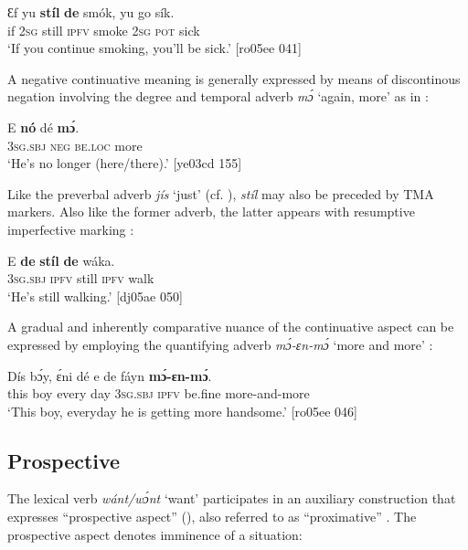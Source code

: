 \ea%
    \label{ex:key:368}
    \gll Ɛf  yu  \textbf{stíl} \textbf{de} smók,  yu  go  sík.\\
if  \textsc{2sg}  still  \textsc{ipfv}  smoke  \textsc{2sg}  \textsc{pot}  sick\\

\glt ‘If you continue smoking, you’ll be sick.’ [ro05ee 041]
\z

A negative continuative meaning is generally expressed by means of discontinous negation involving the degree and temporal adverb \textit{mɔ́} ‘again, more’ as in :


\ea%
    \label{ex:key:369}
    \gll E    \textbf{nó}  dé\textbf{}   \textbf{mɔ́}.\\
\textsc{3sg.sbj}  \textsc{neg}  \textsc{be.loc}  more\\

\glt ‘He’s no longer (here/there).’ [ye03cd 155]
\z

Like the preverbal adverb \textit{jís} ‘just’ (cf. ), \textit{stíl} may also be preceded by TMA markers. Also like the former adverb, the latter appears with resumptive imperfective marking : 


\ea%
    \label{ex:key:370}
    \gll E    \textbf{de} \textbf{stíl} \textbf{de}  wáka.\\
\textsc{3sg.sbj}  \textsc{ipfv}  still  \textsc{ipfv}  walk\\

\glt ‘He’s still walking.’ [dj05ae 050]
\z

A gradual and inherently comparative nuance of the continuative aspect can be expressed by employing the quantifying adverb \textit{mɔ́-ɛn-mɔ́} ‘more and more’ : 


\ea%
    \label{ex:key:371}
    \gll Dís  bɔ́y,    ɛ́ni    dé  e    de  fáyn    \textbf{mɔ́-ɛn-mɔ́}.\\
this  boy    every  day  \textsc{3sg.sbj}  \textsc{ipfv}  be.fine  more-and-more\\

\glt ‘This boy, everyday he is getting more handsome.’ [ro05ee 046]
\z

\subsection{Prospective} 

The lexical verb \textit{wánt/wɔ́nt} ‘want’ participates in an auxiliary construction that expresses “prospective aspect” (\citealt[64–65]{Comrie1976}), also referred to as “proximative” \citep[36]{Heine1994}. The prospective aspect denotes imminence of a situation:


